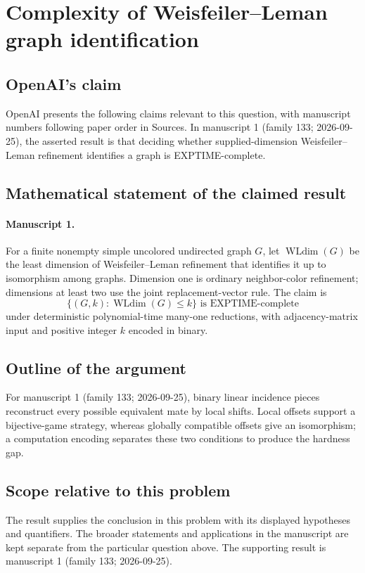 \documentclass[11pt]{article}
\begin{document}
\section*{Complexity of Weisfeiler–Leman graph identification}

\subsection{OpenAI's claim}
OpenAI presents the following claims relevant to this question, with manuscript numbers following paper order in Sources. In manuscript 1 (family 133; 2026-09-25), the asserted result is that deciding whether supplied-dimension Weisfeiler--Leman refinement identifies a graph is EXPTIME-complete.

\subsection{Mathematical statement of the claimed result}
\paragraph{Manuscript 1.}
For a finite nonempty simple uncolored undirected graph $G$, let $\operatorname{WLdim}(G)$ be the least dimension of Weisfeiler--Leman refinement that identifies it up to isomorphism among graphs. Dimension one is ordinary neighbor-color refinement; dimensions at least two use the joint replacement-vector rule. The claim is
\[
 \{(G,k):\operatorname{WLdim}(G)\le k\}\text{ is EXPTIME-complete}
\]
under deterministic polynomial-time many-one reductions, with adjacency-matrix input and positive integer $k$ encoded in binary.

\subsection{Outline of the argument}
For manuscript 1 (family 133; 2026-09-25), binary linear incidence pieces reconstruct every possible equivalent mate by local shifts. Local offsets support a bijective-game strategy, whereas globally compatible offsets give an isomorphism; a computation encoding separates these two conditions to produce the hardness gap.

\subsection{Scope relative to this problem}
The result supplies the conclusion in this problem with its displayed hypotheses and quantifiers. The broader statements and applications in the manuscript are kept separate from the particular question above. The supporting result is manuscript 1 (family 133; 2026-09-25).
\end{document}
